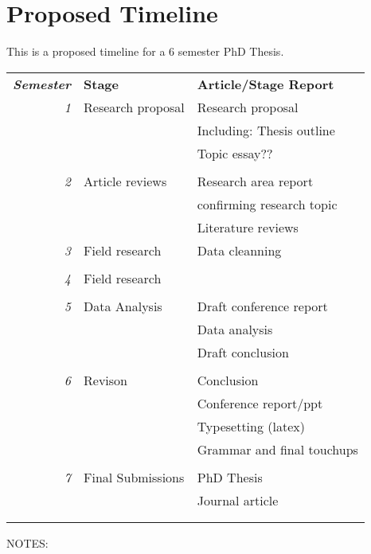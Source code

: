 \documentclass[12pt, twoside]{article}
\begin{document}
\section{Proposed Timeline}

This is a proposed timeline for a 6 semester PhD Thesis.\\


\begin{tabular}{r|p{5cm}p{7cm}}
	
	\emph{\textbf{Semester}}& \textbf{Stage} & \textbf{Article/Stage Report}\\
	
	
	\emph{1} & Research proposal & Research proposal \\
	&&\footnotesize{\hspace{0.5cm}Including: Thesis outline}\\
	&& Topic essay??\\
	&&\\
	\emph{2} & Article reviews & Research area report\\
	&&\footnotesize{\hspace{0.5cm}confirming research topic}\\
	&& Literature reviews\\
	
	\emph{3} & Field research & Data cleanning\\
	&&\\
	
	\emph{4} & Field research & \\
	&&\\
	
	\emph{5} & Data Analysis & Draft conference report\\
	&& Data analysis\\
	&& Draft conclusion\\
	&&\\	
	\emph{6} & Revison & Conclusion\\
	&& Conference report/ppt\\
	&& Typesetting (latex)\\
	&& Grammar and final touchups\\
	&&\\
	
	\emph{7} & Final Submissions & PhD Thesis  \\
	&&Journal article\\
	
	\\\multicolumn{2}{c}{} 
\end{tabular}
\newline
\footnotesize{NOTES: }
\end{document}
